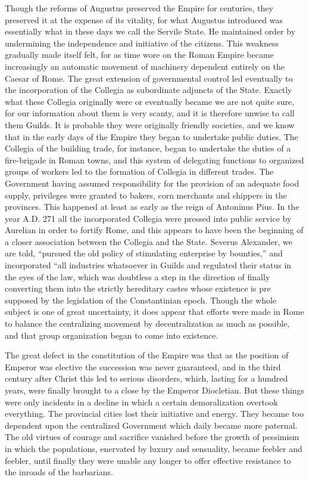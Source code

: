 \documentclass{book}
\begin{document}
Though the reforms of Augustus preserved the Empire for centuries, they preserved it at the expense of its vitality, for what Augustus introduced was essentially what in these days we call the Servile State. He maintained order by undermining the independence and initiative of the citizens. This weakness gradually made itself felt, for as time wore on the Roman Empire became increasingly an automatic movement of machinery dependent entirely on the Caesar of Rome. The great extension of governmental control led eventually to the incorporation of the Collegia as subordinate adjuncts of the State. Exactly what these Collegia originally were or eventually became we are not quite sure, for our information about them is very scanty, and it is therefore unwise to call them Guilds. It is probable they were originally friendly societies, and we know that in the early days of the Empire they began to undertake public duties. The Collegia of the building trade, for instance, began to undertake the duties of a fire-brigade in Roman towns, and this system of delegating functions to organized groups of workers led to the formation of Collegia in different trades. The Government having assumed responsibility for the provision of an adequate food supply, privileges were granted to bakers, corn merchants and shippers in the provinces. This happened at least as early as the reign of Antoninus Pius. In the year A.D. 271 all the incorporated Collegia were pressed into public service by Aurelian in order to fortify Rome, and this appears to have been the beginning of a closer association between the Collegia and the State. Severus Alexander, we are told, “pursued the old policy of stimulating enterprise by bounties,” and incorporated “all industries whatsoever in Guilds and regulated their status in the eyes of the law, which was doubtless a step in the direction of finally converting them into the strictly hereditary castes whose existence is pre supposed by the legislation of the Constantinian epoch. Though the whole subject is one of great uncertainty, it does appear that efforts were made in Rome to balance the centralizing movement by decentralization as much as possible, and that group organization began to come into existence.\footnotemark[8]

The great defect in the constitution of the Empire was that as the position of Emperor was elective the succession was never guaranteed, and in the third century after Christ this led to serious disorders, which, lasting for a hundred years, were finally brought to a close by the Emperor Diocletian. But these things were only incidents in a decline in which a certain demoralization overtook everything. The provincial cities lost their initiative and energy. They became too dependent upon the centralized Government which daily became more paternal. The old virtues of courage and sacrifice vanished before the growth of pessimism in which the populations, enervated by luxury and sensuality, became feebler and feebler, until finally they were unable any longer to offer effective resistance to the inroads of the barbarians.
\end{document}
